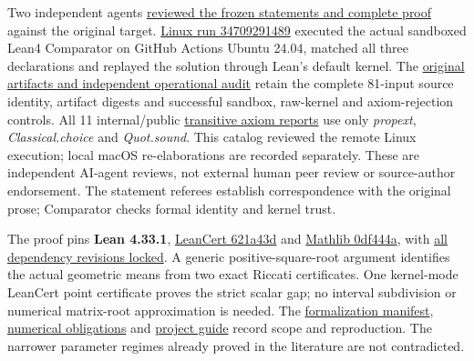 \documentclass[11pt,a4paper]{article}
\begin{document}
Two independent agents
\href{https://github.com/ajt60gaibb/OpenProblemsInNLA/blob/main/matrix-inequalities-and-norms/MI-21/lean/reviews}{reviewed
the frozen statements and complete proof} against the original target.
\href{https://github.com/sgstepaniants/OpenProblemsInNLA/actions/runs/34709291489}{Linux
run 34709291489} executed the actual sandboxed Lean4 Comparator on
GitHub Actions Ubuntu 24.04, matched all three declarations and replayed
the solution through Lean's default kernel. The
\href{https://github.com/ajt60gaibb/OpenProblemsInNLA/blob/main/matrix-inequalities-and-norms/MI-21/lean/verification/linux-2026-09-12}{original
artifacts and independent operational audit} retain the complete
81-input source identity, artifact digests and successful sandbox,
raw-kernel and axiom-rejection controls. All 11 internal/public
\href{https://github.com/ajt60gaibb/OpenProblemsInNLA/blob/main/matrix-inequalities-and-norms/MI-21/lean/verification/proof-axioms.json}{transitive
axiom reports} use only \textit{propext}, \textit{Classical.choice} and
\textit{Quot.sound}. This catalog reviewed the remote Linux execution;
local macOS re-elaborations are recorded separately. These are
independent AI-agent reviews, not external human peer review or
source-author endorsement. The statement referees establish
correspondence with the original prose; Comparator checks formal
identity and kernel trust.

The proof pins \textbf{Lean 4.33.1},
\href{https://github.com/alerad/leancert/tree/621a43d7cf21f87872392a01e874f2f1dbddc926}{LeanCert
621a43d} and
\href{https://github.com/leanprover-community/mathlib4/tree/0df444a360eaa60ab8c11dca51a86af692955474}{Mathlib
0df444a}, with
\href{https://github.com/ajt60gaibb/OpenProblemsInNLA/blob/main/matrix-inequalities-and-norms/MI-21/lean/lake-manifest.json}{all
dependency revisions locked}. A generic positive-square-root argument
identifies the actual geometric means from two exact Riccati
certificates. One kernel-mode LeanCert point certificate proves the
strict scalar gap; no interval subdivision or numerical matrix-root
approximation is needed. The
\href{https://github.com/ajt60gaibb/OpenProblemsInNLA/blob/main/matrix-inequalities-and-norms/MI-21/lean/formalization.yaml}{formalization
manifest},
\href{https://github.com/ajt60gaibb/OpenProblemsInNLA/blob/main/matrix-inequalities-and-norms/MI-21/lean/NUMERICAL_TARGETS.md}{numerical
obligations} and
\href{https://github.com/ajt60gaibb/OpenProblemsInNLA/blob/main/matrix-inequalities-and-norms/MI-21/lean/README.md}{project
guide} record scope and reproduction. The narrower parameter regimes
already proved in the literature are not contradicted.
\end{document}
